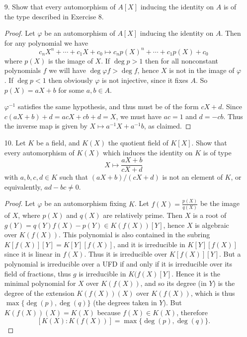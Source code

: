 \documentclass[10pt]{article}
\begin{document}
\begin{enumerate}
\begin{proof}
If $\varphi$ is constrained to fix $A$, then it obviously extends to the unique homomorphism $$c_nX^n + \cdots + c_1X + c_0 \mapsto c_n(aX + b)^n + \cdots + c_1(aX + b) + c_0.$$
This map has an inverse, which is $X \mapsto a^{-1}X - a^{-1}b$ (being of the same form, this also extends to a unique homomorphism fixing $A$).  The composition of these maps clearly gives the identity on $X$ and on $A$, and so the composition is the unique extension of $X \mapsto X$ fixing $A$, which is the identity.  So this is an automorphism of $A[X]$.
\end{proof}

\item[9.] Show that every automorphism of $A[X]$ inducing the identity on $A$ is of the type described in Exercise 8.

\begin{proof}
Let $\varphi$ be an automorphism of $A[X]$ inducing the identity on $A$.  Then for any polynomial we have
$$
c_nX^n + \cdots + c_1X + c_0 \mapsto c_np(X)^n + \cdots + c_1p(X) + c_0
$$
where $p(X)$ is the image of $X$.  If $\deg p > 1$ then for all nonconstant polynomials $f$ we will have $\deg \varphi f > \deg f$, hence $X$ is not in the image of $\varphi$.  If $\deg p < 1$ then obviously $\varphi$ is not injective, since it fixes $A$.  So $p(X) = aX + b$ for some $a,b \in A$.

$\varphi^{-1}$ satisfies the same hypothesis, and thus must be of the form $cX + d$.  Since $c(aX+b)+d = acX + cb + d = X$, we must have $ac = 1$ and $d = -cb$.  Thus the inverse map is given by $X \mapsto a^{-1}X + a^{-1}b$, as claimed.
\end{proof}

\item[10.] Let $K$ be a field, and $K(X)$ the quotient field of $K[X]$.  Show that every automorphism of $K(X)$ which induces the identity on $K$ is of type
$$
X \mapsto \frac{aX+b}{cX+d}
$$
with $a,b,c,d \in K$ such that $(aX+b)/(cX+d)$ is not an element of $K$, or equivalently, $ad-bc \neq 0$.

\begin{proof}
Let $\varphi$ be an automorphism fixing $K$.  Let $f(X) = \frac{p(X)}{q(X)}$ be the image of $X$, where $p(X)$ and $q(X)$ are relatively prime.  Then $X$ is a root of $g(Y) = q(Y)f(X) - p(Y) \in K(f(X))[Y]$, hence $X$ is algebraic over $K(f(X))$.  This polynomial is also contained in the subring $K[f(X)][Y] = K[Y][f(X)]$, and it is irreducible in $K[Y][f(X)]$ since it is linear in $f(X)$.  Thus it is irreducible over $K[f(X)][Y]$.  But a polynomial is irreducible over a UFD if and only if it is irreducible over its field of fractions, thus $g$ is irreducible in $K(f(X)[Y]$.  Hence it is the minimal polynomial for $X$ over $K(f(X))$, and so its degree (in $Y$) is the degree of the extension $K(f(X))(X)$ over $K(f(X))$, which is thus $\max\{\deg(p),\deg(q)\}$ (the degrees taken in $Y$).  But $K(f(X))(X) = K(X)$ because $f(X) \in K(X)$, therefore
$$
[K(X):K(f(X))] = \max\{\deg(p),\deg(q)\}.
$$


\end{proof}
\end{enumerate}
\end{document}

